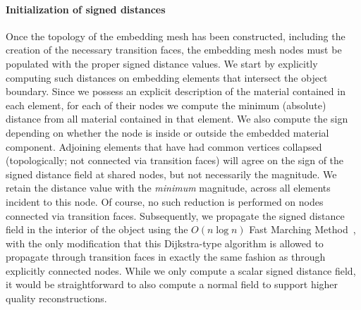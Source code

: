 \paragraph{Initialization of signed distances} Once the topology of
the embedding mesh has been constructed, including the creation of the
necessary transition faces, the embedding mesh nodes must be populated
with the proper signed distance values. We start by explicitly
computing such distances on embedding elements that intersect the
object boundary. Since we possess an explicit description of the
material contained in each element, for each of their nodes we compute
the minimum (absolute) distance from all material contained in that
element. We also compute the sign depending on whether the node is
inside or outside the embedded material component. Adjoining elements
that have had common vertices collapsed (topologically; not connected
via transition faces) will agree on the sign of the signed distance
field at shared nodes, but not necessarily the magnitude. We retain
the distance value with the \emph{minimum} magnitude, across all
elements incident to this node. Of course, no such reduction is
performed on nodes connected via transition faces. Subsequently, we
propagate the signed distance field in the interior of the object
using the $O(n\log n)$ Fast Marching Method~\cite{Sethi:1998}, with
the only modification that this Dijkstra-type algorithm is allowed to
propagate through transition faces in exactly the same fashion as
through explicitly connected nodes.  While we only compute a scalar
signed distance field, it would be straightforward to also compute a
normal field \cite{KobbeBSS:2001} to support higher quality
reconstructions.

